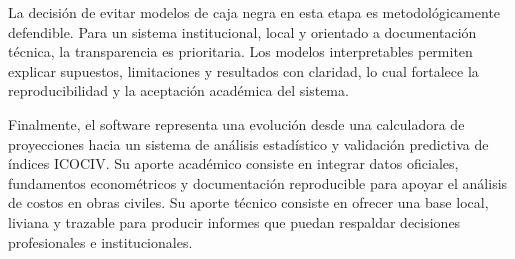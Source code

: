 La decisión de evitar modelos de caja negra en esta etapa es metodológicamente defendible. Para un sistema institucional, local y orientado a documentación técnica, la transparencia es prioritaria. Los modelos interpretables permiten explicar supuestos, limitaciones y resultados con claridad, lo cual fortalece la reproducibilidad y la aceptación académica del sistema.

Finalmente, el software representa una evolución desde una calculadora de proyecciones hacia un sistema de análisis estadístico y validación predictiva de índices ICOCIV. Su aporte académico consiste en integrar datos oficiales, fundamentos econométricos y documentación reproducible para apoyar el análisis de costos en obras civiles. Su aporte técnico consiste en ofrecer una base local, liviana y trazable para producir informes que puedan respaldar decisiones profesionales e institucionales.
